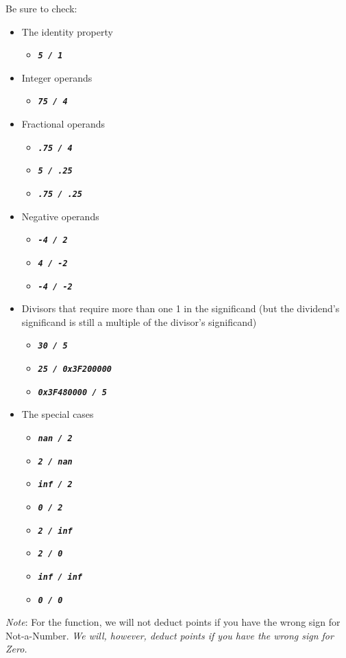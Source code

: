 Be sure to check:
\begin{itemize}
    \item The identity property
    \begin{itemize}
        \item[] \texttt{\textbf{\textit{5 / 1}}}
    \end{itemize}
    \item Integer operands
    \begin{itemize}
        \item[] \texttt{\textbf{\textit{75 / 4}}}
    \end{itemize}
    \item Fractional operands
    \begin{itemize}
        \item[] \texttt{\textbf{\textit{.75 / 4}}}
        \item[] \texttt{\textbf{\textit{5 / .25}}}
        \item[] \texttt{\textbf{\textit{.75 / .25}}}
    \end{itemize}
    \item Negative operands
    \begin{itemize}
        \item[] \texttt{\textbf{\textit{-4 / 2}}}
        \item[] \texttt{\textbf{\textit{4 / -2}}}
        \item[] \texttt{\textbf{\textit{-4 / -2}}}
    \end{itemize}
    \item Divisors that require more than one 1 in the significand (but the dividend's significand is still a multiple of the divisor's significand)
    \begin{itemize}
        \item[] \texttt{\textbf{\textit{30 / 5}}}
        \item[] \texttt{\textbf{\textit{25 / 0x3F200000}}}
        \item[] \texttt{\textbf{\textit{0x3F480000 / 5}}}
    \end{itemize}
    \item The special cases
    \begin{itemize}
        \item[] \texttt{\textbf{\textit{nan / 2}}}
        \item[] \texttt{\textbf{\textit{2 / nan}}}
        \item[] \texttt{\textbf{\textit{inf / 2}}}
        \item[] \texttt{\textbf{\textit{0 / 2}}}
        \item[] \texttt{\textbf{\textit{2 / inf}}}
        \item[] \texttt{\textbf{\textit{2 / 0}}}
        \item[] \texttt{\textbf{\textit{inf / inf}}}
        \item[] \texttt{\textbf{\textit{0 / 0}}}
    \end{itemize}
\end{itemize}

\textit{Note}: For the  function, we will not deduct points if you have the wrong sign for Not-a-Number.
\textit{We will, however, deduct points if you have the wrong sign for Zero.}